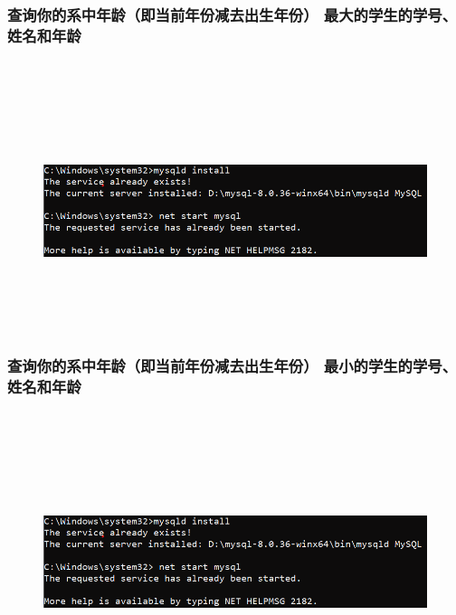 \documentclass{ctexart}
\begin{document}
\subsubsection{查询你的系中年龄（即当前年份减去出生年份） 最大的学生的学号、姓名和年龄}
\begin{lstlisting}[language=sql]
	
\end{lstlisting}
\begin{figure}[H]
	\centering 
	\includegraphics[height=7cm,width=14cm]{1.png}
	\end{figure}
\subsubsection{查询你的系中年龄（即当前年份减去出生年份） 最小的学生的学号、姓名和年龄}
\begin{lstlisting}[language=sql]
	
\end{lstlisting}
\begin{figure}[H]
	\centering 
	\includegraphics[height=7cm,width=14cm]{1.png}
	\end{figure}
\end{document}
